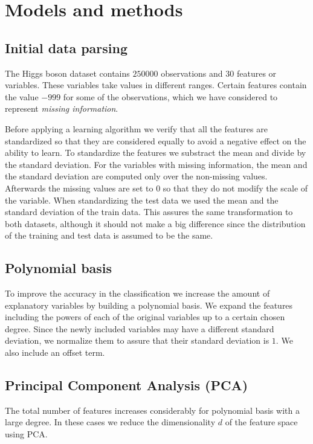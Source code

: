 \documentclass[10pt,conference,compsocconf]{IEEEtran}
\begin{document}
\section{Models and methods}
	\label{sec:models-methods}
	\subsection{Initial data parsing} %
	\label{sub:initial_data_parsing}
  	The Higgs boson dataset contains $250000$ observations and $30$ features or variables. These variables take values in different ranges. Certain features contain the value $-999$ for some of the observations, which we have considered to represent \emph{missing information}. %

  	Before applying a learning algorithm we verify that all the features are standardized so that they are considered equally to avoid a negative effect on the ability to learn. To standardize the features we substract the mean and divide by the standard deviation. For the variables with missing information, the mean and the standard deviation are computed only over the non-missing values. Afterwards the missing values are set to $0$ so that they do not modify the scale of the variable. When standardizing the test data we used the mean and the standard deviation of the train data. This assures the same transformation to both datasets, although it should not make a big difference since the distribution of the training and test data is assumed to be the same.

	\subsection{Polynomial basis} %
	\label{sub:polynomial_basis}
  	To improve the accuracy in the classification we increase the amount of explanatory variables by building a polynomial basis. We expand the features including the powers of each of the original variables up to a certain chosen degree. Since the newly included variables may have a different standard deviation, we normalize them to assure that their standard deviation is $1$. We also include an offset term.

	\subsection{Principal Component Analysis (PCA)} %
	\label{sub:principal_component_analysis}
  	The total number of features increases considerably for polynomial basis with a large degree. In these cases we reduce the dimensionality $d$ of the feature space using PCA.
\end{document}
